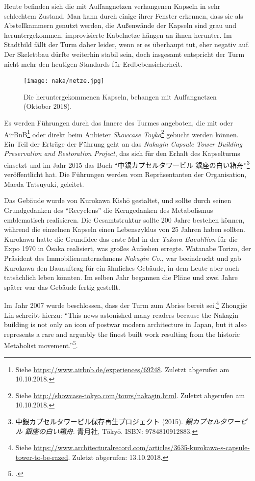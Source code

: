 \documentclass[a4paper, 12pt]{article}
\begin{document}
\begin{onehalfspace}
Heute befinden sich die mit Auffangnetzen verhangenen Kapseln in sehr schlechtem Zustand. Man kann durch einige ihrer Fenster erkennen, dass sie als Abstellkammern genutzt werden, die Außenwände der Kapseln sind grau und heruntergekommen, improvisierte Kabelnetze hängen an ihnen herunter. Im Stadtbild fällt der Turm daher leider, wenn er es überhaupt tut, eher negativ auf. Der Skelettbau dürfte weiterhin stabil sein, doch insgesamt entspricht der Turm nicht mehr den heutigen Standards für Erdbebensicherheit.

\begin{figure}[h]
    \centering
    \texttt{[image: naka/netze.jpg]}
    \caption{Die heruntergekommenen Kapseln, behangen mit Auffangnetzen (Oktober 2018).}
    \label{fig:netze}
\end{figure}

Es werden Führungen durch das Innere des Turmes angeboten, die mit oder AirBnB\footnote{Siehe \url{https://www.airbnb.de/experiences/69248}. Zuletzt abgerufen am 10.10.2018.} oder direkt beim Anbieter \emph{Showcase Toyko}\footnote{Siehe \url{http://showcase-tokyo.com/tours/nakagin.html}. Zuletzt abgerufen am 10.10.2018.} gebucht werden können. Ein Teil der Erträge der Führung geht an das \emph{Nakagin Capsule Tower Building Preservation and Restoration Project}, das sich für den Erhalt des Kapselturms einsetzt und im Jahr 2015 das Buch "`中銀カプセルタワービル 銀座の白い箱舟"'\footnote{中銀カプセルタワービル保存再生プロジェクト (2015). \emph{銀カプセルタワービル 銀座の白い箱舟}. 青月社, Tōkyō. ISBN: 9784810912883.} veröffentlicht hat. Die Führungen werden vom Repräsentanten der Organisation, Maeda Tatsuyuki, geleitet.

Das Gebäude wurde von Kurokawa Kishō gestaltet, und sollte durch seinen Grundgedanken des "`Recyclens"' die Kerngedanken des Metabolismus emblematisch realisieren. Die Gesamtstruktur sollte 200 Jahre bestehen können, während die einzelnen Kapseln einen Lebenszyklus von 25 Jahren haben sollten. Kurokawa hatte die Grundidee das erste Mal in der \emph{Takara Baeutilion} für die Expo 1970 in Ôsaka realisiert, was großes Aufsehen erregte. Watanabe Torizo, der Präsident des Immobilienunternehmens \emph{Nakagin Co.}, war beeindruckt und gab Kurokawa den Bauauftrag für ein ähnliches Gebäude, in dem Leute aber auch tatsächlich leben könnten. Im selben Jahr begannen die Pläne und zwei Jahre später war das Gebäude fertig gestellt. 

Im Jahr 2007 wurde beschlossen, dass der Turm zum Abriss bereit sei.\footnote{Siehe \url{https://www.architecturalrecord.com/articles/3635-kurokawa-s-capsule-tower-to-be-razed}. Zuletzt abgerufen: 13.10.2018.} Zhongjie Lin schreibt hierzu: "`This news astonished many readers because the Nakagin building is not only an icon of postwar modern architecture in Japan, but it also represents a rare and arguably the finest built work resulting from the historic Metabolist movement."'\footnote{\Cite[Siehe][S. 14]{lin2011nakagin}.}.




\end{onehalfspace}
\end{document}
